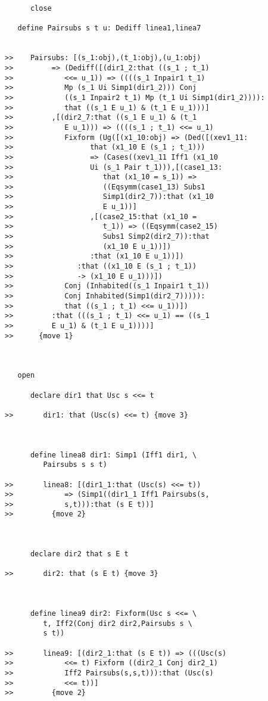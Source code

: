 \documentclass[12pt]{article}
\begin{document}
\begin{verbatim}
      close

   define Pairsubs s t u: Dediff linea1,linea7


>>    Pairsubs: [(s_1:obj),(t_1:obj),(u_1:obj)
>>         => (Dediff([(dir1_2:that ((s_1 ; t_1)
>>            <<= u_1)) => ((((s_1 Inpair1 t_1)
>>            Mp (s_1 Ui Simp1(dir1_2))) Conj
>>            ((s_1 Inpair2 t_1) Mp (t_1 Ui Simp1(dir1_2)))):
>>            that ((s_1 E u_1) & (t_1 E u_1)))]
>>         ,[(dir2_7:that ((s_1 E u_1) & (t_1
>>            E u_1))) => ((((s_1 ; t_1) <<= u_1)
>>            Fixform (Ug([(x1_10:obj) => (Ded([(xev1_11:
>>                  that (x1_10 E (s_1 ; t_1)))
>>                  => (Cases((xev1_11 Iff1 (x1_10
>>                  Ui (s_1 Pair t_1))),[(case1_13:
>>                     that (x1_10 = s_1)) =>
>>                     ((Eqsymm(case1_13) Subs1
>>                     Simp1(dir2_7)):that (x1_10
>>                     E u_1))]
>>                  ,[(case2_15:that (x1_10 =
>>                     t_1)) => ((Eqsymm(case2_15)
>>                     Subs1 Simp2(dir2_7)):that
>>                     (x1_10 E u_1))])
>>                  :that (x1_10 E u_1))])
>>               :that ((x1_10 E (s_1 ; t_1))
>>               -> (x1_10 E u_1)))])
>>            Conj (Inhabited((s_1 Inpair1 t_1))
>>            Conj Inhabited(Simp1(dir2_7))))):
>>            that ((s_1 ; t_1) <<= u_1))])
>>         :that (((s_1 ; t_1) <<= u_1) == ((s_1
>>         E u_1) & (t_1 E u_1))))]
>>      {move 1}



   open

      declare dir1 that Usc s <<= t

>>       dir1: that (Usc(s) <<= t) {move 3}



      define linea8 dir1: Simp1 (Iff1 dir1, \
         Pairsubs s s t)

>>       linea8: [(dir1_1:that (Usc(s) <<= t))
>>            => (Simp1((dir1_1 Iff1 Pairsubs(s,
>>            s,t))):that (s E t))]
>>         {move 2}



      declare dir2 that s E t

>>       dir2: that (s E t) {move 3}



      define linea9 dir2: Fixform(Usc s <<= \
         t, Iff2(Conj dir2 dir2,Pairsubs s \
         s t))

>>       linea9: [(dir2_1:that (s E t)) => (((Usc(s)
>>            <<= t) Fixform ((dir2_1 Conj dir2_1)
>>            Iff2 Pairsubs(s,s,t))):that (Usc(s)
>>            <<= t))]
>>         {move 2}




\end{verbatim}
\end{document}
